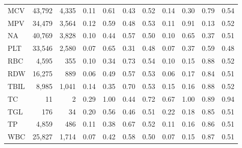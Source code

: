 \begin{table}[ht]
\begin{tabular}{lrrrrrrrrrr}
MCV & 43,792 & 4,335 & 0.11 & 0.61 & 0.43 & 0.52 & 0.14 & 0.30 & 0.79 & 0.54 \\
MPV & 34,479 & 3,564 & 0.12 & 0.59 & 0.48 & 0.53 & 0.11 & 0.91 & 0.13 & 0.52 \\
NA & 40,769 & 3,828 & 0.10 & 0.44 & 0.57 & 0.50 & 0.10 & 0.65 & 0.37 & 0.51 \\
PLT & 33,546 & 2,580 & 0.07 & 0.65 & 0.31 & 0.48 & 0.07 & 0.37 & 0.59 & 0.48 \\
RBC & 4,595 & 355 & 0.10 & 0.34 & 0.73 & 0.54 & 0.10 & 0.15 & 0.88 & 0.52 \\
RDW & 16,275 & 889 & 0.06 & 0.49 & 0.57 & 0.53 & 0.06 & 0.17 & 0.84 & 0.51 \\
TBIL & 8,985 & 1,041 & 0.14 & 0.35 & 0.70 & 0.53 & 0.15 & 0.16 & 0.88 & 0.52 \\
TC & 11 & 2 & 0.29 & 1.00 & 0.44 & 0.72 & 0.67 & 1.00 & 0.89 & 0.94 \\
TGL & 176 & 34 & 0.20 & 0.56 & 0.46 & 0.51 & 0.22 & 0.18 & 0.85 & 0.51 \\
TP & 4,859 & 486 & 0.11 & 0.38 & 0.67 & 0.52 & 0.11 & 0.16 & 0.86 & 0.51 \\
WBC & 25,827 & 1,714 & 0.07 & 0.42 & 0.58 & 0.50 & 0.07 & 0.15 & 0.87 & 0.51 \\
\bottomrule
\end{tabular}
\label{tab:eicu_eval_mortality}
\end{table}